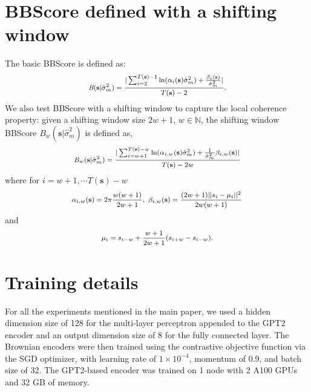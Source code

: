 \documentclass[letterpaper]{article} %
\def \bb{\textit{B}}
\def \ss{\mathbf{s}}
\begin{document}
\section{BBScore defined with a shifting window}
\label{sec:app2_bb_window}
The basic BBScore is defined as:
\begin{equation}
\label{eq:evaluation_measure1}
\footnotesize
\begin{aligned}
\bb (\ss| \hat{\sigma}_m^2) = \frac{|\sum_{i=2}^{T(\ss)-1} \ln(\alpha_i(\ss) \hat{\sigma}_m^2)+ \frac{\beta_i(\ss)}{\hat{\sigma}_m^2}|}{T(\ss)-2}.
\end{aligned}
\end{equation}
We also test BBScore with a shifting window to capture the local coherence property: given a shifting window size $2w+1$, $w\in \mathbb{N}$, the shifting window BBScore $\bb_w (\ss| \hat{\sigma}_m^2)$ is defined as,
\begin{equation}
\label{eq:BBScore_shifting_windows}
\footnotesize
\begin{aligned}
\bb_w (\ss| \hat{\sigma}_m^2) = \frac{|\sum_{i=w+1}^{T(\ss)-w} \ln(\alpha_{i,w}(\ss) \hat{\sigma}_m^2)+ \frac{1}{\hat{\sigma}_m^2} \beta_{i,w}(\ss)|}{T(\ss)-2w}
\end{aligned}
\end{equation}
where for $i=w+1,\cdots T(\ss)-w$
\begin{equation*}
\footnotesize
\begin{aligned}
\alpha_{i,w}(\ss) = 2\pi \frac{w(w+1)}{2w+1}, \ \beta_{i,w}(\ss) = \frac{(2w+1)||s_i -\mu_i||^2}{ 2w(w+1)}
\end{aligned}
\end{equation*}
and
\begin{equation*}
\footnotesize
\begin{aligned}
\mu_i = s_{i-w} + \frac{w+1}{2w+1}(s_{i+w} - s_{i-w}).
\end{aligned}
\end{equation*}

\section{Training details}
\label{training_detail}
For all the experiments mentioned in the main paper, we used a hidden dimension size of 128 for the multi-layer perceptron appended to the GPT2 encoder and an output dimension size of 8 for the fully connected layer. The Brownian encoders were then trained using the contrastive objective function via the SGD optimizer, with learning rate of $1 \times 10^{-4}$, momentum of 0.9, and batch size of 32. The GPT2-based encoder was trained on 1 node with 2 A100 GPUs and 32 GB of memory.
\fontsize{9.5pt}{10.5pt}
\selectfont



\end{document}
